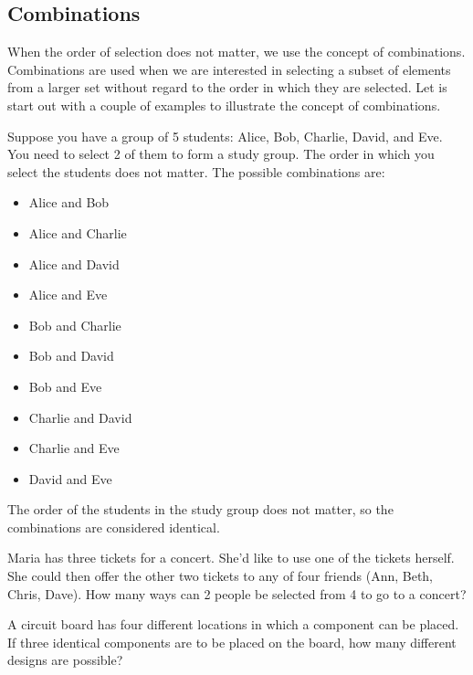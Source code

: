 \subsection*{Combinations}

When the order of selection does not matter, we use the concept of combinations. Combinations are used when we are interested in selecting a subset of elements from a larger set without regard to the order in which they are selected. Let is start out with a couple of examples to illustrate the concept of combinations.

\begin{example}
    Suppose you have a group of 5 students: Alice, Bob, Charlie, David, and Eve. You need to select 2 of them to form a study group. The order in which you select the students does not matter. The possible combinations are:
    \begin{itemize}
        \item Alice and Bob
        \item Alice and Charlie
        \item Alice and David
        \item Alice and Eve
        \item Bob and Charlie
        \item Bob and David
        \item Bob and Eve
        \item Charlie and David
        \item Charlie and Eve
        \item David and Eve
    \end{itemize}
    The order of the students in the study group does not matter, so the combinations are considered identical.
\end{example}

\begin{example}
    Maria has three tickets for a concert. She'd like to use one of the tickets herself. She could then offer the other two tickets to any of four friends (Ann, Beth, Chris, Dave). How many ways can 2 people be selected from 4 to go to a concert?
\end{example}

\begin{example}
A circuit board has four different locations in which a component can be placed. If three identical components are to be placed on the board, how many different designs are possible?
\end{example}

